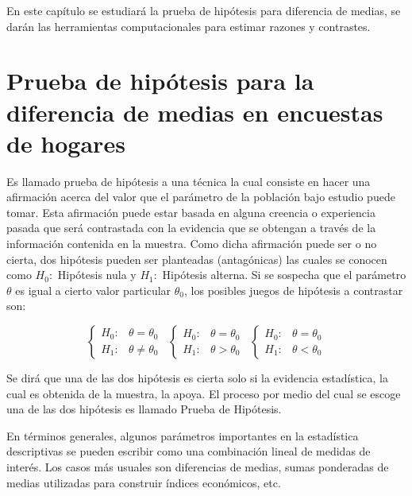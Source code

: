 \documentclass[
  12pt,
]{book}
\begin{document}
En este capítulo se estudiará la prueba de hipótesis para diferencia de medias, se darán las herramientas computacionales para estimar razones y contrastes.

\hypertarget{prueba-de-hipuxf3tesis-para-la-diferencia-de-medias-en-encuestas-de-hogares}{%
\section{Prueba de hipótesis para la diferencia de medias en encuestas de hogares}\label{prueba-de-hipuxf3tesis-para-la-diferencia-de-medias-en-encuestas-de-hogares}}

Es llamado prueba de hipótesis a una técnica la cual consiste en hacer una afirmación acerca del valor que el parámetro de la población bajo estudio puede tomar. Esta afirmación puede estar basada en alguna creencia o experiencia pasada que será contrastada con la evidencia que se obtengan a través de la información contenida en la muestra. Como dicha afirmación puede ser o no cierta, dos hipótesis pueden ser planteadas (antagónicas) las cuales se conocen como \(H_{0}:\) Hipótesis nula y \(H_{1}:\) Hipótesis alterna. Si se sospecha que el parámetro \(\theta\) es igual a cierto valor particular \(\theta_{0}\), los posibles juegos de hipótesis a contrastar son:

\[
\begin{cases}
H_{0}: & \theta=\theta_{0}\\
H_{1}: & \theta\neq\theta_{0}
\end{cases}\,\,\,   \begin{cases}
H_{0}: & \theta=\theta_{0}\\
H_{1}: & \theta>\theta_{0}
\end{cases}\,\,\,   \begin{cases}
H_{0}: & \theta=\theta_{0}\\
H_{1}: & \theta<\theta_{0}
\end{cases}
\]

Se dirá que una de las dos hipótesis es cierta solo si la evidencia estadística, la cual es obtenida de la muestra, la apoya. El proceso por medio del cual se escoge una de las dos hipótesis es llamado Prueba de Hipótesis.

En términos generales, algunos parámetros importantes en la estadística descriptivas se pueden escribir como una combinación lineal de medidas de interés. Los casos más usuales son diferencias de medias, sumas ponderadas de medias utilizadas para construir índices económicos, etc.
\end{document}
